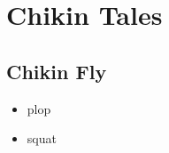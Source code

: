     \section{Chikin Tales}
    \subsection{Chikin Fly}

    \begin{itemize}
    \item plop
    \item squat
    \end{itemize}
